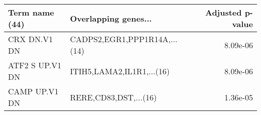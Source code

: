 \begin{tabular}{llr}
\toprule
 Term name (44) &         Overlapping genes... &  Adjusted p-value \\
\midrule
   CRX DN.V1 DN & CADPS2,EGR1,PPP1R14A,...(14) &          8.09e-06 \\
ATF2 S UP.V1 DN &    ITIH5,LAMA2,IL1R1,...(16) &          8.09e-06 \\
  CAMP UP.V1 DN &        RERE,CD83,DST,...(16) &          1.36e-05 \\
\bottomrule
\end{tabular}
